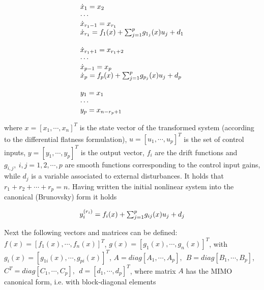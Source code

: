 \documentclass[journal]{IEEEtran}
\begin{document}
\begin{equation} \label{MIMO_system_Brunovsky_canonical_form}
\begin{tabular}{l}
$\dot{x}_1=x_2$ \\
$\cdots$ \\
$\dot{x}_{r_1-1}=x_{r_1}$ \\
$\dot{x}_{r_1}=f_1(x)+{\sum_{j=1}^p}{g_{1_j}(x)}u_j+d_1$\\
$$ \\
$\dot{x}_{r_1+1}=x_{r_1+2}$ \\
$\cdots$ \\
$\dot{x}_{p-1}=x_{p}$ \\
$\dot{x}_{p}=f_p(x)+{\sum_{j=1}^p}{g_{p_j}(x)}u_j+d_p$\\
$$ \\
$y_1=x_1$ \\
$\cdots$ \\
$y_p=x_{n-r_p+1}$
\end{tabular}
\end{equation}

\noindent where $x=[x_1,\cdots,x_n]^T$ is the state vector of the transformed system (according to the differential flatness formulation), $u=[u_1,\cdots,u_p]^T$ is the set of control inputs, $y=[y_1,\cdots,y_p]^T$ is the output vector, $f_i$ are the drift functions and $g_{i,j}, \ i,j=1,2,\cdots,p$ are smooth functions corresponding to the control input gains, while $d_j$ is a variable associated to external disturbances. It holds that $r_1+r_2+\cdots+r_p=n$. Having written the initial nonlinear system into the canonical (Brunovsky) form it holds

\begin{equation} \label{compact_Brunovsky_form_dynamics}
\begin{tabular}{c}
$y_i^{(r_i)}=f_i(x)+{\sum_{j=1}^p}g_{ij}(x)u_j+d_j$
\end{tabular}
\end{equation}

\noindent Next the following vectors and matrices can be defined:
$f(x)=[f_1(x),\cdots,f_n(x)]^T$, $g(x)=[g_1(x),\cdots,g_n(x)]^T$, with  $g_i(x)=[g_{1i}(x),\cdots,g_{pi}(x)]^T$, $A=diag[A_1,\cdots,A_p], \ \  B=diag[B_1,\cdots,B_p]$, $C^T=diag[C_1,\cdots,C_p], \ \ d=[d_1,\cdots,d_p]^T$, where matrix $A$ has the MIMO canonical form, i.e. with block-diagonal elements
\end{document}
